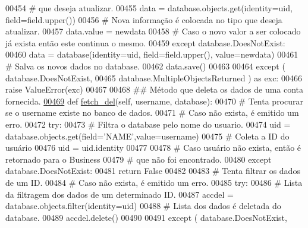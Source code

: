 \begin{DoxyCode}
00454                 \textcolor{comment}{# que deseja atualizar.}
00455                 data = database.objects.get(identity=uid, field=field.upper())
00456                 \textcolor{comment}{# Nova informação é colocada no tipo que deseja atualizar.}
00457                 data.value = newdata
00458             \textcolor{comment}{# Caso o novo valor a ser colocado já exista então este continua o mesmo.}
00459             \textcolor{keywordflow}{except} database.DoesNotExist:
00460                 data = database(identity=uid, field=field.upper(), value=newdata)
00461             \textcolor{comment}{# Salva os novos dados no database.}
00462             data.save()
00463 
00464         \textcolor{keywordflow}{except} ( database.DoesNotExist, 
00465                  database.MultipleObjectsReturned ) \textcolor{keyword}{as} exc:
00466             \textcolor{keywordflow}{raise} ValueError(exc)
00467 
00468     \textcolor{comment}{## Método que deleta os dados de uma conta fornecida.}
\hypertarget{AdmUnit_8py_source_l00469}{}\hyperlink{classAdm_1_1AdmUnit_1_1PersAdm_a2b5453709dfc3b1c6e5f9f85dc61d228}{00469}     \textcolor{keyword}{def }\hyperlink{classAdm_1_1AdmUnit_1_1PersAdm_a2b5453709dfc3b1c6e5f9f85dc61d228}{fetch\_del}(self, username, database):
00470         \textcolor{comment}{# Tenta procurar se o username existe no banco de dados.}
00471         \textcolor{comment}{# Caso não exista, é emitido um erro.}
00472         \textcolor{keywordflow}{try}:
00473             \textcolor{comment}{# Filtra o database pelo nome do usuario.}
00474             uid = database.objects.get(field=\textcolor{stringliteral}{'NAME'},value=username)
00475             \textcolor{comment}{# Coleta a ID do usuário}
00476             uid = uid.identity
00477 
00478         \textcolor{comment}{# Caso usuário não exista, então é retornado para o Business}
00479         \textcolor{comment}{# que não foi encontrado.}
00480         \textcolor{keywordflow}{except} database.DoesNotExist:
00481             \textcolor{keywordflow}{return} \textcolor{keyword}{False}
00482 
00483         \textcolor{comment}{# Tenta filtrar os dados de um ID.}
00484         \textcolor{comment}{# Caso não exista, é emitido um erro.}
00485         \textcolor{keywordflow}{try}:   
00486             \textcolor{comment}{# Lista da filtragem dos dados de um determinado ID.}
00487             accdel = database.objects.filter(identity=uid)
00488             \textcolor{comment}{# Lista dos dados é deletada do database.}
00489             accdel.delete()
00490        
00491         \textcolor{keywordflow}{except} ( database.DoesNotExist, 

\end{DoxyCode}
